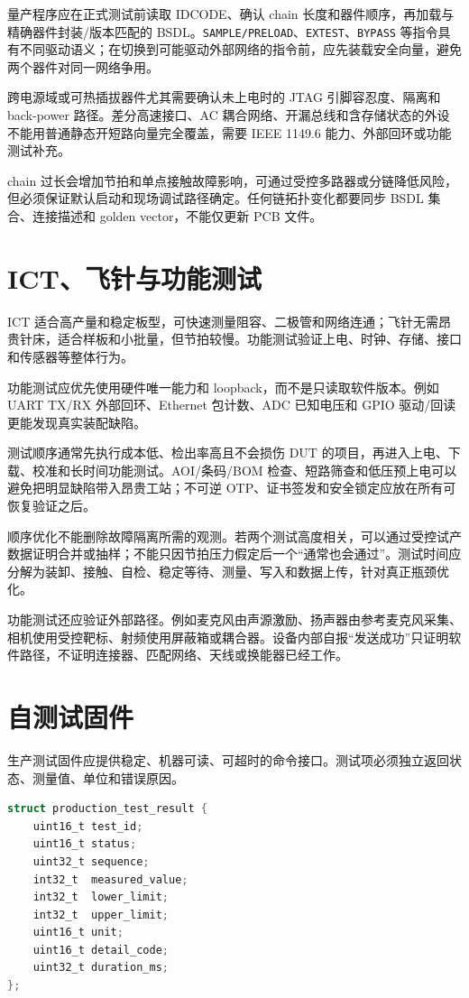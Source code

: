 量产程序应在正式测试前读取 IDCODE、确认 chain 长度和器件顺序，再加载与精确器件封装/版本匹配的 BSDL。\texttt{SAMPLE/PRELOAD}、\texttt{EXTEST}、\texttt{BYPASS} 等指令具有不同驱动语义；在切换到可能驱动外部网络的指令前，应先装载安全向量，避免两个器件对同一网络争用。

跨电源域或可热插拔器件尤其需要确认未上电时的 JTAG 引脚容忍度、隔离和 back-power 路径。差分高速接口、AC 耦合网络、开漏总线和含存储状态的外设不能用普通静态开短路向量完全覆盖，需要 IEEE 1149.6 能力、外部回环或功能测试补充。

chain 过长会增加节拍和单点接触故障影响，可通过受控多路器或分链降低风险，但必须保证默认启动和现场调试路径确定。任何链拓扑变化都要同步 BSDL 集合、连接描述和 golden vector，不能仅更新 PCB 文件。

\section{ICT、飞针与功能测试}

ICT 适合高产量和稳定板型，可快速测量阻容、二极管和网络连通；飞针无需昂贵针床，适合样板和小批量，但节拍较慢。功能测试验证上电、时钟、存储、接口和传感器等整体行为。

功能测试应优先使用硬件唯一能力和 loopback，而不是只读取软件版本。例如 UART TX/RX 外部回环、Ethernet 包计数、ADC 已知电压和 GPIO 驱动/回读更能发现真实装配缺陷。

测试顺序通常先执行成本低、检出率高且不会损伤 DUT 的项目，再进入上电、下载、校准和长时间功能测试。AOI/条码/BOM 检查、短路筛查和低压预上电可以避免把明显缺陷带入昂贵工站；不可逆 OTP、证书签发和安全锁定应放在所有可恢复验证之后。

顺序优化不能删除故障隔离所需的观测。若两个测试高度相关，可以通过受控试产数据证明合并或抽样；不能只因节拍压力假定后一个“通常也会通过”。测试时间应分解为装卸、接触、自检、稳定等待、测量、写入和数据上传，针对真正瓶颈优化。

功能测试还应验证外部路径。例如麦克风由声源激励、扬声器由参考麦克风采集、相机使用受控靶标、射频使用屏蔽箱或耦合器。设备内部自报“发送成功”只证明软件路径，不证明连接器、匹配网络、天线或换能器已经工作。

\section{自测试固件}

生产测试固件应提供稳定、机器可读、可超时的命令接口。测试项必须独立返回状态、测量值、单位和错误原因。

\begin{lstlisting}[language=C,caption={生产测试结果的逻辑结构}]
struct production_test_result {
    uint16_t test_id;
    uint16_t status;
    uint32_t sequence;
    int32_t  measured_value;
    int32_t  lower_limit;
    int32_t  upper_limit;
    uint16_t unit;
    uint16_t detail_code;
    uint32_t duration_ms;
};
\end{lstlisting}

